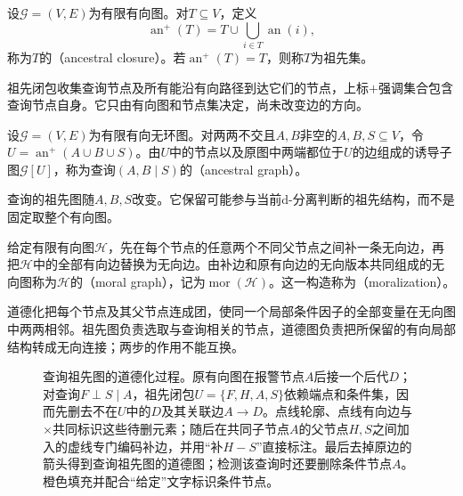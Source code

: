 \begin{definition}[祖先闭包]
  \label{def:pgm-representations-ancestral-closure}
  设$\mathcal{G}=(V,E)$为有限有向图。对$T\subseteq V$，定义
  \[
    \operatorname{an}^{+}(T)=T\cup\bigcup_{i\in T}\operatorname{an}(i),
  \]
  称为$T$的（ancestral closure）。若$\operatorname{an}^{+}(T)=T$，则称$T$为祖先集。
\end{definition}

祖先闭包收集查询节点及所有能沿有向路径到达它们的节点，上标$+$强调集合包含查询节点自身。它只由有向图和节点集决定，尚未改变边的方向。

\begin{definition}[查询的祖先图]
  \label{def:pgm-representations-query-ancestral-graph}
  设$\mathcal{G}=(V,E)$为有限有向无环图。对两两不交且$A,B$非空的$A,B,S\subseteq V$，令$U=\operatorname{an}^{+}(A\cup B\cup S)$。由$U$中的节点以及原图中两端都位于$U$的边组成的诱导子图$\mathcal{G}[U]$，称为查询$(A,B\mid S)$的（ancestral graph）。
\end{definition}

查询的祖先图随$A,B,S$改变。它保留可能参与当前d-分离判断的祖先结构，而不是固定取整个有向图。

\begin{definition}[有向图的道德图]
  \label{def:pgm-representations-moral-graph}
  给定有限有向图$\mathcal{H}$，先在每个节点的任意两个不同父节点之间补一条无向边，再把$\mathcal{H}$中的全部有向边替换为无向边。由补边和原有向边的无向版本共同组成的无向图称为$\mathcal{H}$的（moral graph），记为$\operatorname{mor}(\mathcal{H})$。这一构造称为（moralization）。
\end{definition}

道德化把每个节点及其父节点连成团，使同一个局部条件因子的全部变量在无向图中两两相邻。祖先图负责选取与查询相关的节点，道德图负责把所保留的有向局部结构转成无向连接；两步的作用不能互换。

\begin{figure}[htbp]
  \centering
  
  \caption{查询祖先图的道德化过程。原有向图在报警节点$A$后接一个后代$D$；对查询$F\perp S\mid A$，祖先闭包$U=\{F,H,A,S\}$依赖端点和条件集，因而先删去不在$U$中的$D$及其关联边$A\to D$。点线轮廓、点线有向边与$\times$共同标识这些待删元素；随后在共同子节点$A$的父节点$H,S$之间加入的虚线专门编码补边，并用“补$H-S$”直接标注。最后去掉原边的箭头得到查询祖先图的道德图；检测该查询时还要删除条件节点$A$。橙色填充并配合“给定”文字标识条件节点。}
  \label{fig:pgm-representations-ancestral-moralization}
\end{figure}

